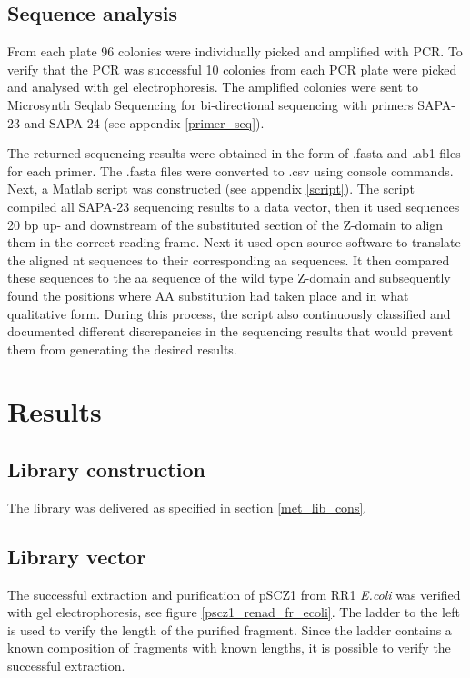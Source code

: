 \documentclass{article}
\begin{document}
\begin{multicols}{2}
	\subsection{Sequence analysis}
	From each plate 96 colonies were individually picked and amplified with PCR. To verify that the PCR was successful 10 colonies from each PCR plate were picked and analysed with gel electrophoresis. The amplified colonies were sent to Microsynth Seqlab Sequencing for bi-directional sequencing with primers SAPA-23 and SAPA-24 (see appendix \ref{primer_seq}).
	
	The returned sequencing results were obtained in the form of .fasta and .ab1 files for each primer. The .fasta files were converted to .csv using console commands. Next, a Matlab script was constructed (see appendix \ref{script}). The script compiled all SAPA-23 sequencing results to a data vector, then it used sequences 20 bp up- and downstream of the substituted section of the Z-domain to align them in the correct reading frame. Next it used open-source software to translate the aligned nt sequences to their corresponding aa sequences. It then compared these sequences to the aa sequence of the wild type Z-domain and subsequently found the positions where AA substitution had taken place and in what qualitative form. During this process, the script also continuously classified and documented different discrepancies in the sequencing results that would prevent them from generating the desired results.
	

	\section{Results}
	\subsection{Library construction}
	The library was delivered as specified in section \ref{met_lib_cons}.
	
	\subsection{Library vector}
	The successful extraction and purification of pSCZ1 from RR1 \textit{E.coli} was verified with gel electrophoresis, see figure \ref{pscz1_renad_fr_ecoli}. The ladder to the left is used to verify the length of the purified fragment. Since the ladder contains a known composition of fragments with known lengths, it is possible to verify the successful extraction.
	

\end{multicols}
\end{document}
